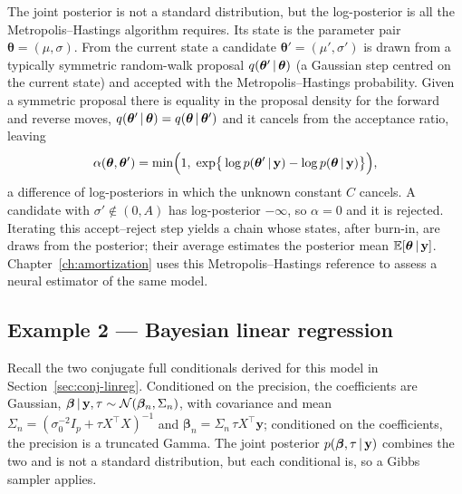 The joint posterior is not a standard distribution, but the
log-posterior is all the Metropolis--Hastings algorithm requires. Its
state is the parameter pair $\bm{\theta} = (\mu, \sigma)$. From the
current state a candidate $\bm{\theta}' = (\mu', \sigma')$ is drawn from
a typically symmetric random-walk proposal $q(\bm{\theta}' \,|\, \bm{\theta})$ (a
Gaussian step centred on the current state) and accepted with the
Metropolis--Hastings probability. Given a symmetric proposal there is equality in the proposal density for the forward and reverse moves,
$q(\bm{\theta}' \,|\, \bm{\theta}) = q(\bm{\theta} \,|\, \bm{\theta}')$
and it cancels from the acceptance ratio, leaving
%
\begin{equation}
  \alpha(\bm{\theta}, \bm{\theta}')
  = \min\!\Big(1,\;
    \exp\!\big\{
      \log p(\bm{\theta}' \,|\, \mathbf{y})
      - \log p(\bm{\theta} \,|\, \mathbf{y})
    \big\}\Big),
\end{equation}
%
a difference of log-posteriors in which the unknown constant $C$
cancels. A candidate with $\sigma' \notin (0, A)$ has log-posterior
$-\infty$, so $\alpha = 0$ and it is rejected. Iterating this
accept--reject step yields a chain whose states, after burn-in, are
draws from the posterior; their average estimates the posterior mean
$\mathbb{E}[\bm{\theta} \,|\, \mathbf{y}]$. Chapter~\ref{ch:amortization} uses
this Metropolis--Hastings reference to assess a neural estimator of the
same model.

\subsection{Example 2 --- Bayesian linear regression}
\label{sec:cs-linreg}

Recall the two conjugate full conditionals derived for this model in
Section~\ref{sec:conj-linreg}. Conditioned on the precision, the
coefficients are Gaussian,
$\bm{\beta} \,|\, \mathbf{y}, \tau \sim
\mathcal{N}(\bm{\beta}_n, \Sigma_n)$, with covariance and mean
$\Sigma_n = (\sigma_0^{-2} I_p + \tau X^{\!\top}X)^{-1}$ and
$\bm{\beta}_n = \Sigma_n\,\tau X^{\!\top}\mathbf{y}$; conditioned on the
coefficients, the precision is a truncated Gamma. The joint posterior
$p(\bm{\beta}, \tau \,|\, \mathbf{y})$ combines the two and is not a
standard distribution, but each conditional is, so a Gibbs sampler
applies.

